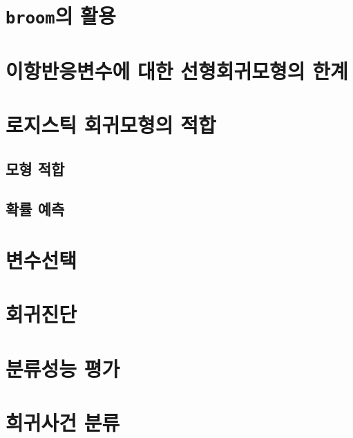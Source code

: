 \documentclass[
]{book}
\begin{document}
\hypertarget{broomuxc758-uxd65cuxc6a9}{%
\section{\texorpdfstring{\texttt{broom}의 활용}{broom의 활용}}\label{broomuxc758-uxd65cuxc6a9}}

\hypertarget{uxc774uxd56duxbc18uxc751uxbcc0uxc218uxc5d0-uxb300uxd55c-uxc120uxd615uxd68cuxadc0uxbaa8uxd615uxc758-uxd55cuxacc4}{%
\section{이항반응변수에 대한 선형회귀모형의 한계}\label{uxc774uxd56duxbc18uxc751uxbcc0uxc218uxc5d0-uxb300uxd55c-uxc120uxd615uxd68cuxadc0uxbaa8uxd615uxc758-uxd55cuxacc4}}

\hypertarget{uxb85cuxc9c0uxc2a4uxd2f1-uxd68cuxadc0uxbaa8uxd615uxc758-uxc801uxd569}{%
\section{로지스틱 회귀모형의 적합}\label{uxb85cuxc9c0uxc2a4uxd2f1-uxd68cuxadc0uxbaa8uxd615uxc758-uxc801uxd569}}

\hypertarget{uxbaa8uxd615-uxc801uxd569}{%
\subsection{모형 적합}\label{uxbaa8uxd615-uxc801uxd569}}

\hypertarget{uxd655uxb960-uxc608uxce21}{%
\subsection{확률 예측}\label{uxd655uxb960-uxc608uxce21}}

\hypertarget{uxbcc0uxc218uxc120uxd0dd-1}{%
\section{변수선택}\label{uxbcc0uxc218uxc120uxd0dd-1}}

\hypertarget{uxd68cuxadc0uxc9c4uxb2e8-1}{%
\section{회귀진단}\label{uxd68cuxadc0uxc9c4uxb2e8-1}}

\hypertarget{uxbd84uxb958uxc131uxb2a5-uxd3c9uxac00}{%
\section{분류성능 평가}\label{uxbd84uxb958uxc131uxb2a5-uxd3c9uxac00}}

\hypertarget{uxd76cuxadc0uxc0acuxac74-uxbd84uxb958}{%
\section{희귀사건 분류}\label{uxd76cuxadc0uxc0acuxac74-uxbd84uxb958}}

  
\end{document}

